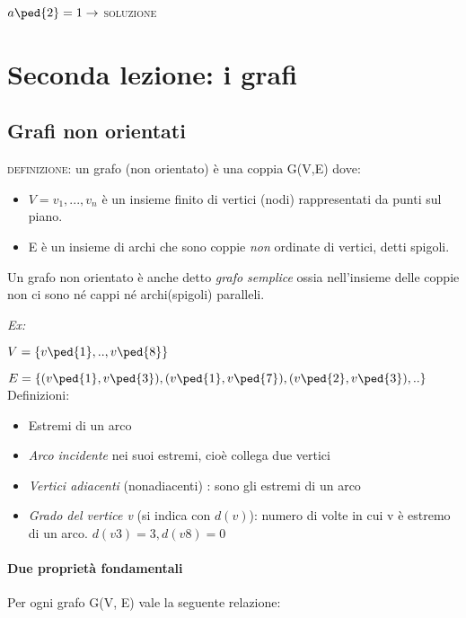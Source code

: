 \documentclass[12pt,a4paper]{article}
\begin{document}
\( a\ped{2} = 1 \rightarrow \) \textsc{soluzione} \par 

\newpage



\section{Seconda lezione: i grafi}
\subsection{Grafi non orientati}
    \textsc{definizione:} un grafo (non orientato) è una coppia G(V,E) dove:
    \begin{itemize}
\item \( V={v_1, ...,v_n} \) è un insieme finito di vertici (nodi) rappresentati da punti sul piano.
\item E è un insieme di archi che sono coppie \emph{non} ordinate di vertici, detti spigoli.
    \end{itemize}
    Un grafo non orientato è anche detto \emph{grafo semplice} ossia nell'insieme delle coppie non ci sono né cappi né archi(spigoli) paralleli.

\textit{Ex:} \par
\( V = \{ v\ped{1}, .. , v\ped{8} \} \) \par
\( E = \{ (v\ped{1}, v\ped{3}), (v\ped{1}, v\ped{7}), (v\ped{2}, v\ped{3}), .. \} \) \\

Definizioni:
\begin{itemize}
    \item Estremi di un arco
    \item \emph{Arco incidente} nei suoi estremi, cioè collega due vertici
    \item \emph{Vertici adiacenti} (nonadiacenti) : sono gli estremi di un arco
    \item \emph{Grado del vertice v} (si indica con $d(v)$): numero di volte in cui v è estremo di un arco. \(d(v3)=3, d(v8)=0 \)
\end{itemize}

\paragraph{Due proprietà fondamentali} \par
    Per ogni grafo G(V, E) vale la seguente relazione: \par
\end{document}
